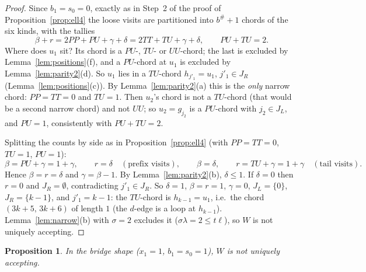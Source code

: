 \documentclass[11pt]{article}
\newtheorem{proposition}[theorem]{Proposition}
\theoremstyle{definition}
\begin{document}
\begin{proof}
Since $b_1=s_0=0$, exactly as in Step~2 of the proof of
Proposition~\ref{prop:ell4} the loose visits are partitioned into
$b^{\#}+1$ chords of the six kinds, with the tallies
\[
\beta+r=2PP+PU+\gamma+\delta=2TT+TU+\gamma+\delta,\qquad PU+TU=2 .
\]
Where does $u_1$ sit? Its chord is a $PU$-, $TU$- or $UU$-chord; the last
is excluded by Lemma~\ref{lem:positions}(f), and a $PU$-chord at $u_1$ is
excluded by Lemma~\ref{lem:parity2}(d). So $u_1$ lies in a $TU$-chord
$h_{j'_1}=u_1$, $j'_1\in J_R$ (Lemma~\ref{lem:positions}(c)). By
Lemma~\ref{lem:parity2}(a) this is the \emph{only} narrow chord: $PP=TT=0$
and $TU=1$. Then $u_2$'s chord is not a $TU$-chord (that would be a second
narrow chord) and not $UU$; so $u_2=g_{j_2}$ is a $PU$-chord with
$j_2\in J_L$, and $PU=1$, consistently with $PU+TU=2$.

Splitting the counts by side as in Proposition~\ref{prop:ell4} (with
$PP=TT=0$, $TU=1$, $PU=1$):
\[
\beta=PU+\gamma=1+\gamma,\qquad r=\delta \quad(\text{prefix visits}),
\qquad
\beta=\delta,\qquad r=TU+\gamma=1+\gamma\quad(\text{tail visits}).
\]
Hence $\beta=r=\delta$ and $\gamma=\beta-1$. By
Lemma~\ref{lem:parity2}(b), $\delta\le1$. If $\delta=0$ then $r=0$ and
$J_R=\emptyset$, contradicting $j'_1\in J_R$. So $\delta=1$,
$\beta=r=1$, $\gamma=0$, $J_L=\{0\}$, $J_R=\{k-1\}$, and $j'_1=k-1$: the
$TU$-chord is $h_{k-1}=u_1$, i.e.\ the chord $(3k+5,\,3k+6)$ of length
$1$ (the $d$-edge is a loop at $h_{k-1}$). Lemma~\ref{lem:narrow}(b) with
$\sigma=2$ excludes it ($\sigma\lambda=2\le t\ell$), so $W$ is not
uniquely accepting.
\end{proof}

\begin{proposition}\label{prop:ell2bridge}
In the bridge shape ($x_1=1$, $b_1=s_0=1$), $W$ is not uniquely accepting.
\end{proposition}
\end{document}
